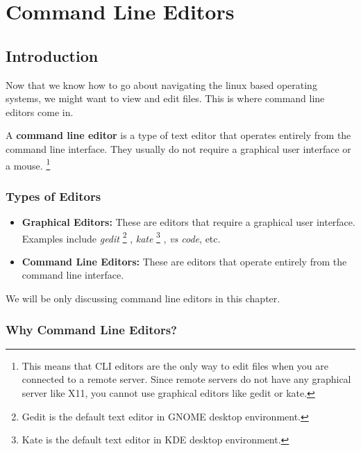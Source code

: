 \setchapterpreamble[u]{\margintoc}
\chapter{Command Line Editors}

\section{Introduction}

Now that we know how to go about navigating the linux based operating systems, we might want to view and edit files.
This is where command line editors come in.

\begin{definition}
A \textbf{command line editor} is a type of text editor that operates entirely from the command line interface.
They usually do not require a graphical user interface or a mouse.
\footnote{
  This means that CLI editors are the only way to edit files when you are connected to a remote server.
  Since remote servers do not have any graphical server like X11, you cannot use graphical editors like gedit or kate.
}
\end{definition}

\subsection{Types of Editors}

\begin{itemize}

\item \textbf{Graphical Editors:} These are editors that require a graphical user interface.
  Examples include \textit{gedit}
  \footnote{
    Gedit is the default text editor in GNOME desktop environment.
  }
  , \textit{kate}
  \footnote{
    Kate is the default text editor in KDE desktop environment.
  }
  , \textit{vs code}, etc.

\item \textbf{Command Line Editors:} These are editors that operate entirely from the command line interface.

\end{itemize}

We will be only discussing command line editors in this chapter.

\subsection{Why Command Line Editors?}

